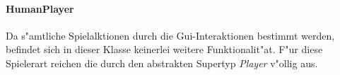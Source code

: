 \paragraph{HumanPlayer}
\label{par:humanPlayer}
Da s"amtliche Spielalktionen durch die Gui-Interaktionen bestimmt werden, befindet sich in dieser Klasse keinerlei weitere Funktionalit"at. F"ur diese Spielerart reichen die durch den abstrakten Supertyp \emph{Player} v"ollig aus. 